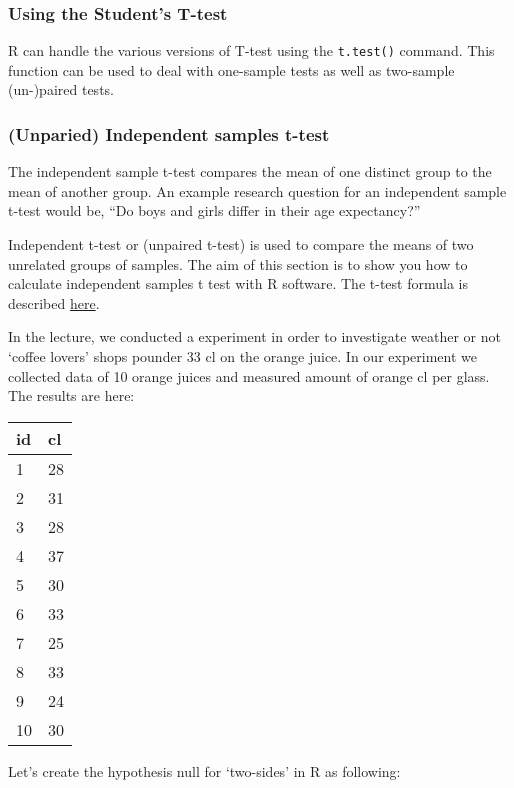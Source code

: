 \documentclass[
]{article}
\begin{document}
\hypertarget{using-the-students-t-test}{%
\subsubsection{Using the Student's
T-test}\label{using-the-students-t-test}}

R can handle the various versions of T-test using the \texttt{t.test()}
command. This function can be used to deal with one-sample tests as well
as two-sample (un-)paired tests.

\hypertarget{unparied-independent-samples-t-test}{%
\subsubsection{(Unparied) Independent samples
t-test}\label{unparied-independent-samples-t-test}}

The independent sample t-test compares the mean of one distinct group to
the mean of another group. An example research question for an
independent sample t-test would be, ``Do boys and girls differ in their
age expectancy?''

Independent t-test or (unpaired t-test) is used to compare the means of
two unrelated groups of samples. The aim of this section is to show you
how to calculate independent samples t test with R software. The t-test
formula is described
\href{http://www.sthda.com/english/wiki/t-test-formula}{here}.

In the lecture, we conducted a experiment in order to investigate
weather or not `coffee lovers' shops pounder 33 cl on the orange juice.
In our experiment we collected data of 10 orange juices and measured
amount of orange cl per glass. The results are here:

\begin{longtable}[]{@{}ll@{}}
\toprule
id & cl \\
\midrule
\endhead
1 & 28 \\
2 & 31 \\
3 & 28 \\
4 & 37 \\
5 & 30 \\
6 & 33 \\
7 & 25 \\
8 & 33 \\
9 & 24 \\
10 & 30 \\
\bottomrule
\end{longtable}

Let's create the hypothesis null for `two-sides' in R as following:
\end{document}
